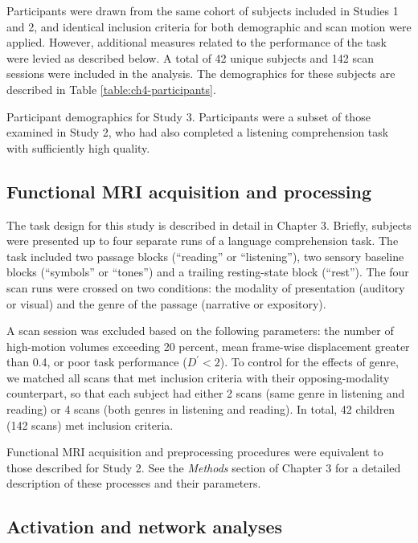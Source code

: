 Participants were drawn from the same cohort of subjects included in Studies 1 and 2, and identical inclusion criteria for both demographic and scan motion were applied. However, additional measures related to the performance of the task were levied as described below. A total of 42 unique subjects and 142 scan sessions were included in the analysis. The demographics for these subjects are described in Table \ref{table:ch4-participants}.

\begin{table}[t]
	\renewcommand{\tabcolsep}{0.09cm}
	\centering
	
	\caption[Participant demographics for Study 3]{Participant demographics for Study 3. Participants were a subset of those examined in Study 2, who had also completed a listening comprehension task with sufficiently high quality.}
	\label{table:ch4-participants}
\end{table}

\subsection{Functional MRI acquisition and processing}

The task design for this study is described in detail in Chapter 3. Briefly, subjects were presented up to four separate runs of a language comprehension task. The task included two passage blocks (``reading'' or ``listening''), two sensory baseline blocks (``symbols'' or ``tones'') and a trailing resting-state block (``rest''). The four scan runs were crossed on two conditions: the modality of presentation (auditory or visual) and the genre of the passage (narrative or expository). 

A scan session was excluded based on the following parameters: the number of high-motion volumes exceeding 20 percent, mean frame-wise displacement greater than 0.4, or poor task performance ($D^\prime < 2$). To control for the effects of genre, we matched all scans that met inclusion criteria with their opposing-modality counterpart, so that each subject had either 2 scans (same genre in listening and reading) or 4 scans (both genres in listening and reading). In total, 42 children (142 scans) met inclusion criteria.

Functional MRI acquisition and preprocessing procedures were equivalent to those described for Study 2. See the \textit{Methods} section of Chapter 3 for a detailed description of these processes and their parameters.

\subsection{Activation and network analyses}


